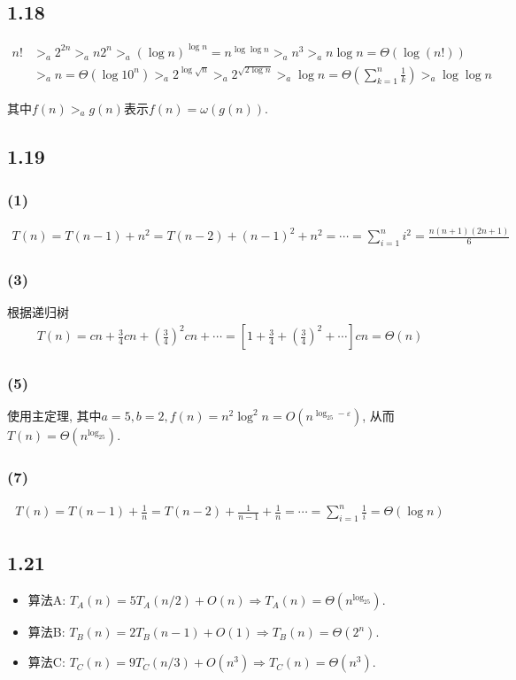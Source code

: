 \documentclass[8pt]{article}
\begin{document}
\subsection*{1.18}
\begin{align*}
	n! &>_a 2^{2n} >_a n2^n >_a (\log n)^{\log n} = n^{\log \log n} >_a n^3 >_a n\log n = \Theta(\log(n!)) \\
	&>_a n = \Theta(\log 10^n) >_a 2^{\log\sqrt n} >_a 2^{\sqrt{2\log n}} >_a \log n = \Theta\left(\sum_{k=1}^{n}\frac 1k\right) >_a \log\log n
\end{align*}

其中$f(n) >_a g(n)$表示$f(n) = \omega(g(n))$.
\fi

\subsection*{1.19}
\subsubsection*{(1)}
\begin{align*}
	T(n) = T(n-1) + n^2 = T(n-2) + (n-1)^2 + n^2 = \cdots = \sum_{i=1}^{n}i^2 = \frac{n(n+1)(2n+1)}{6}
\end{align*}
\subsubsection*{(3)}
根据递归树
\begin{align*}
	T(n) = cn + \frac{3}{4}cn + \left(\frac34\right)^2cn + \cdots = \left[1 + \frac34 + \left(\frac34\right)^2 + \cdots \right]cn = \Theta(n)
\end{align*}
\subsubsection*{(5)}
使用主定理, 其中$a = 5, b = 2, f(n) = n^2\log^2n = O(n^{\log_25 - \varepsilon})$, 从而$T(n) = \Theta(n^{\log_25})$.
\subsubsection*{(7)}
\begin{align*}
	T(n) = T(n-1) + \frac1n = T(n-2) + \frac{1}{n-1} + \frac1n = \cdots = \sum_{i=1}^{n}\frac1i = \Theta(\log n)
\end{align*}

\iffalse
\subsection*{1.21}
\begin{itemize}
	\item 算法A: $T_A(n) = 5T_A(n/2) + O(n) \Rightarrow T_A(n) = \Theta(n^{\log_25})$.
	\item 算法B: $T_B(n) = 2T_B(n-1) + O(1) \Rightarrow T_B(n) = \Theta(2^n)$.
	\item 算法C: $T_C(n) = 9T_C(n/3) + O(n^3) \Rightarrow T_C(n) = \Theta(n^3)$.
\end{itemize}
\end{document}
